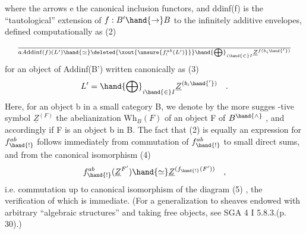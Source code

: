 
where the  arrows e the canonical inclusion functors, and
ddinf(f) is the ``tautological'' extension of $f:B'\hand{\to} B$ to the infinitely
additive envelopes, defined computationally as
(2) \[ \over{a}{A}\mathrm{ddinf}(f)(L') \hand{\simeq} \deleted{\xout{\unsure{f_!^{ab}(L')}}} \hand{\bigoplus}_{i\hand{\in} I} \underline{Z}^{f(b_i\hand{'})} \]
for an object of Addinf(B') written canonically as
(3) \[ L' = \hand{\bigoplus}_{i\hand{\in} I} \underline{Z}^{(b_i\hand{'})} \quad . \]
Here, for an object b in a small category B, we denote by the more sugges%
-tive symbol $\underline{Z}^{(F)}$ the abelianization $\mathrm{Wh}_B(F)$ of an object F of $B^{\hand{\wedge}}$ , and
accordingly if F is an object b in B. The fact that (2) is equally an
expression for $f_{\hand{!}}^{ab}$ follows immediately from commutation of $f_{\hand{!}}^{ab}$ to small
direct sums, and from the canonical isomorphism
(4) \[ f_{\hand{!}}^{ab}(\underline{Z}^{F'}) \hand{\simeq} \underline{Z}^{(f_{\hand{!}}(F'))} \quad , \]
i.e. commutation up to canonical isomorphism of the diagram
(5)  ,
the verification of which is immediate. (For a generalization to sheaves
endowed with arbitrary ``algebraic structures'' and taking free objects,
see SGA 4 I 5.8.3.(p. 30).)

